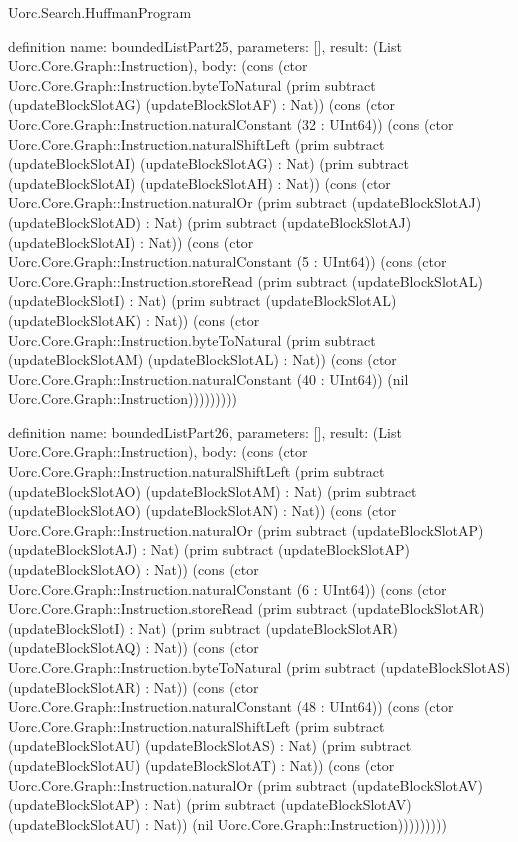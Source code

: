\begin{lexlean}{Uorc.Search.HuffmanProgram}
\begin{semanticmodule}
definition{
  name: boundedListPart25,
  parameters: [],
  result: (List Uorc.Core.Graph::Instruction),
  body: (cons (ctor Uorc.Core.Graph::Instruction.byteToNatural (prim subtract (updateBlockSlotAG) (updateBlockSlotAF) : Nat)) (cons (ctor Uorc.Core.Graph::Instruction.naturalConstant (32 : UInt64)) (cons (ctor Uorc.Core.Graph::Instruction.naturalShiftLeft (prim subtract (updateBlockSlotAI) (updateBlockSlotAG) : Nat) (prim subtract (updateBlockSlotAI) (updateBlockSlotAH) : Nat)) (cons (ctor Uorc.Core.Graph::Instruction.naturalOr (prim subtract (updateBlockSlotAJ) (updateBlockSlotAD) : Nat) (prim subtract (updateBlockSlotAJ) (updateBlockSlotAI) : Nat)) (cons (ctor Uorc.Core.Graph::Instruction.naturalConstant (5 : UInt64)) (cons (ctor Uorc.Core.Graph::Instruction.storeRead (prim subtract (updateBlockSlotAL) (updateBlockSlotI) : Nat) (prim subtract (updateBlockSlotAL) (updateBlockSlotAK) : Nat)) (cons (ctor Uorc.Core.Graph::Instruction.byteToNatural (prim subtract (updateBlockSlotAM) (updateBlockSlotAL) : Nat)) (cons (ctor Uorc.Core.Graph::Instruction.naturalConstant (40 : UInt64)) (nil Uorc.Core.Graph::Instruction)))))))))
}

definition{
  name: boundedListPart26,
  parameters: [],
  result: (List Uorc.Core.Graph::Instruction),
  body: (cons (ctor Uorc.Core.Graph::Instruction.naturalShiftLeft (prim subtract (updateBlockSlotAO) (updateBlockSlotAM) : Nat) (prim subtract (updateBlockSlotAO) (updateBlockSlotAN) : Nat)) (cons (ctor Uorc.Core.Graph::Instruction.naturalOr (prim subtract (updateBlockSlotAP) (updateBlockSlotAJ) : Nat) (prim subtract (updateBlockSlotAP) (updateBlockSlotAO) : Nat)) (cons (ctor Uorc.Core.Graph::Instruction.naturalConstant (6 : UInt64)) (cons (ctor Uorc.Core.Graph::Instruction.storeRead (prim subtract (updateBlockSlotAR) (updateBlockSlotI) : Nat) (prim subtract (updateBlockSlotAR) (updateBlockSlotAQ) : Nat)) (cons (ctor Uorc.Core.Graph::Instruction.byteToNatural (prim subtract (updateBlockSlotAS) (updateBlockSlotAR) : Nat)) (cons (ctor Uorc.Core.Graph::Instruction.naturalConstant (48 : UInt64)) (cons (ctor Uorc.Core.Graph::Instruction.naturalShiftLeft (prim subtract (updateBlockSlotAU) (updateBlockSlotAS) : Nat) (prim subtract (updateBlockSlotAU) (updateBlockSlotAT) : Nat)) (cons (ctor Uorc.Core.Graph::Instruction.naturalOr (prim subtract (updateBlockSlotAV) (updateBlockSlotAP) : Nat) (prim subtract (updateBlockSlotAV) (updateBlockSlotAU) : Nat)) (nil Uorc.Core.Graph::Instruction)))))))))
}


\end{semanticmodule}
\end{lexlean}
